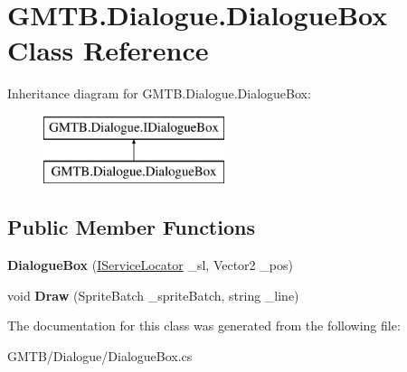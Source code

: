 \hypertarget{class_g_m_t_b_1_1_dialogue_1_1_dialogue_box}{}\section{G\+M\+T\+B.\+Dialogue.\+Dialogue\+Box Class Reference}
\label{class_g_m_t_b_1_1_dialogue_1_1_dialogue_box}
Inheritance diagram for G\+M\+T\+B.\+Dialogue.\+Dialogue\+Box\+:\begin{figure}[H]
\begin{center}
\leavevmode
\includegraphics[height=2.000000cm]{class_g_m_t_b_1_1_dialogue_1_1_dialogue_box}
\end{center}
\end{figure}
\subsection*{Public Member Functions}
\begin{DoxyCompactItemize}
\item 
\mbox{\label{class_g_m_t_b_1_1_dialogue_1_1_dialogue_box_a3c94454fb451ccf10dce4e660226c762}} 
{\bfseries Dialogue\+Box} (\mbox{\hyperlink{interface_g_m_t_b_1_1_interfaces_1_1_i_service_locator}{I\+Service\+Locator}} \+\_\+sl, Vector2 \+\_\+pos)
\item 
\mbox{\label{class_g_m_t_b_1_1_dialogue_1_1_dialogue_box_a3a50bed9a45ad0a2e55674612b8e4603}} 
void {\bfseries Draw} (Sprite\+Batch \+\_\+sprite\+Batch, string \+\_\+line)
\end{DoxyCompactItemize}


The documentation for this class was generated from the following file\+:\begin{DoxyCompactItemize}
\item 
G\+M\+T\+B/\+Dialogue/Dialogue\+Box.\+cs\end{DoxyCompactItemize}
